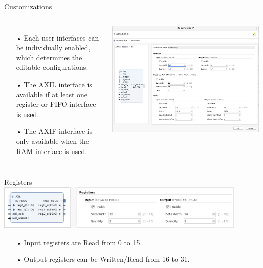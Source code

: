 \documentclass[aspectratio=169]{beamer}
\begin{document}

\begin{frame}{Customizations}
  \begin{columns}
      \begin{itemize}
        \item[•] Each user interfaces can be individually enabled, which determines the editable configurations.
        \item[•] The AXIL interface is available if at least one register or FIFO interface is used.
        \item[•] The AXIF interface is only available when the RAM interface is used.
      \end{itemize}
      \center
      \includegraphics[width=1.0\textwidth]{../vivado/guide/config.png}
  \end{columns}
\end{frame}

\begin{frame}{Registers}
  \center
  \includegraphics[width=0.9\textwidth]{../vivado/guide/only-regs.png}
  \begin{itemize}
    \item[•] Input registers are Read from 0 to 15.
    \item[•] Output registers can be Written/Read from 16 to 31.
  \end{itemize}
\end{frame}
\end{document}
